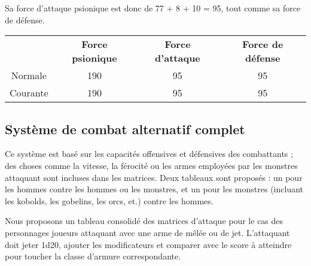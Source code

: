 \bigskip

Sa force d'attaque psionique est donc de 77 + 8 + 10 = 95, tout comme sa force de défense.

\bigskip

\begin{tabular}{cccc}
& \textbf{Force psionique} & \textbf{Force d'attaque} & \textbf{Force de défense}  \\
Normale     & 190 & 95 & 95 \\
Courante    & 190 & 95 & 95 \\
\end{tabular}

\newpage
\subsection*{Système de combat alternatif complet}
\label{custom-combat-alternatif}

Ce système est basé sur les capacités offensives et défensives des combattants ; des choses comme la vitesse, la férocité ou les armes employées par les monstres attaquant sont incluses dans les matrices. Deux tableaux sont proposés : un pour les hommes contre les hommes ou les monstres, et un pour les monstres (incluant les kobolds, les gobelins, les orcs, et.) contre les hommes.

\bigskip

Nous proposons un tableau consolidé des matrices d'attaque pour le cas des personnages joueurs attaquant avec une arme de mêlée ou de jet. L'attaquant doit jeter 1d20, ajouter les modificateurs et comparer avec le score à atteindre pour toucher la classe d'armure correspondante.

\bigskip

